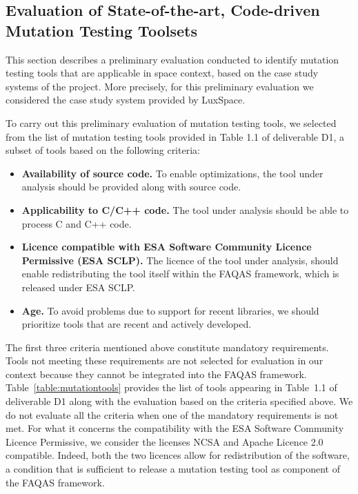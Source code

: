 \clearpage
\subsection{Evaluation of State-of-the-art, Code-driven Mutation Testing Toolsets}
\label{sec:toolsComparison}

This section describes a preliminary evaluation conducted to identify mutation testing tools that are applicable in space context, based on the case study systems of the project. More precisely, for this preliminary evaluation we considered the case study system provided by LuxSpace.

To carry out this preliminary evaluation of mutation testing tools, we selected from the list of mutation testing tools provided in Table 1.1 of deliverable D1, a subset of tools based on the following criteria:

\begin{itemize}
	\item \textbf{Availability of source code.} To enable optimizations, the tool under analysis should be provided along with source code.
	\item \textbf{Applicability to C/C++ code.} The tool under analysis should be able to process C and C++ code.
	\item \textbf{Licence compatible with ESA Software Community Licence Permissive (ESA SCLP).} The licence of the tool under analysis, should enable redistributing the tool itself within the FAQAS framework, which is released under ESA SCLP.
	\item \textbf{Age.} To avoid problems due to support for recent libraries, we should prioritize tools that are recent and actively developed.
\end{itemize}




The first three criteria mentioned above constitute mandatory requirements. 
Tools not meeting these requirements are not selected for evaluation in our context because they cannot be integrated into the FAQAS framework.
Table~\ref{table:mutationtools} provides the list of tools appearing in Table~1.1 of deliverable D1 along with the evaluation based on the criteria specified above. We do not evaluate all the criteria when one of the mandatory requirements is not met.
For what it concerns the compatibility with the ESA Software Community Licence Permissive, we consider the licenses NCSA and Apache Licence 2.0 compatible. 
Indeed, both the two licences allow for redistribution of the software, a condition that is sufficient to release a mutation testing tool as component of the FAQAS framework.

